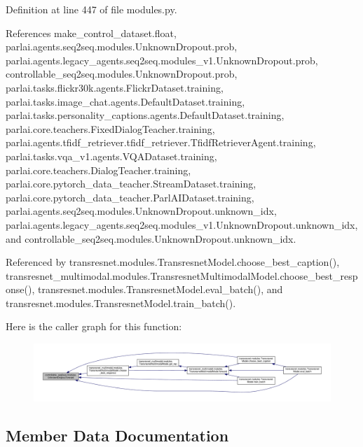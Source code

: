 Definition at line 447 of file modules.\+py.



References make\+\_\+control\+\_\+dataset.\+float, parlai.\+agents.\+seq2seq.\+modules.\+Unknown\+Dropout.\+prob, parlai.\+agents.\+legacy\+\_\+agents.\+seq2seq.\+modules\+\_\+v1.\+Unknown\+Dropout.\+prob, controllable\+\_\+seq2seq.\+modules.\+Unknown\+Dropout.\+prob, parlai.\+tasks.\+flickr30k.\+agents.\+Flickr\+Dataset.\+training, parlai.\+tasks.\+image\+\_\+chat.\+agents.\+Default\+Dataset.\+training, parlai.\+tasks.\+personality\+\_\+captions.\+agents.\+Default\+Dataset.\+training, parlai.\+core.\+teachers.\+Fixed\+Dialog\+Teacher.\+training, parlai.\+agents.\+tfidf\+\_\+retriever.\+tfidf\+\_\+retriever.\+Tfidf\+Retriever\+Agent.\+training, parlai.\+tasks.\+vqa\+\_\+v1.\+agents.\+V\+Q\+A\+Dataset.\+training, parlai.\+core.\+teachers.\+Dialog\+Teacher.\+training, parlai.\+core.\+pytorch\+\_\+data\+\_\+teacher.\+Stream\+Dataset.\+training, parlai.\+core.\+pytorch\+\_\+data\+\_\+teacher.\+Parl\+A\+I\+Dataset.\+training, parlai.\+agents.\+seq2seq.\+modules.\+Unknown\+Dropout.\+unknown\+\_\+idx, parlai.\+agents.\+legacy\+\_\+agents.\+seq2seq.\+modules\+\_\+v1.\+Unknown\+Dropout.\+unknown\+\_\+idx, and controllable\+\_\+seq2seq.\+modules.\+Unknown\+Dropout.\+unknown\+\_\+idx.



Referenced by transresnet.\+modules.\+Transresnet\+Model.\+choose\+\_\+best\+\_\+caption(), transresnet\+\_\+multimodal.\+modules.\+Transresnet\+Multimodal\+Model.\+choose\+\_\+best\+\_\+response(), transresnet.\+modules.\+Transresnet\+Model.\+eval\+\_\+batch(), and transresnet.\+modules.\+Transresnet\+Model.\+train\+\_\+batch().

Here is the caller graph for this function\+:
\nopagebreak
\begin{figure}[H]
\begin{center}
\leavevmode
\includegraphics[width=350pt]{classcontrollable__seq2seq_1_1modules_1_1UnknownDropout_a875d78f9d759c57eaa5d42aab22ecaeb_icgraph}
\end{center}
\end{figure}


\subsection{Member Data Documentation}
\mbox{\label{classcontrollable__seq2seq_1_1modules_1_1UnknownDropout_a5305b89df485d6ab49f1037b4fa11449}} 
